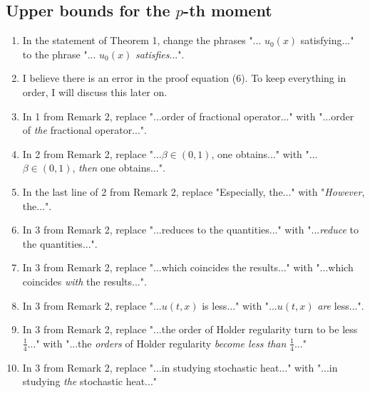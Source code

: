 \documentclass[a4paper,11pt]{article}
\numberwithin{equation}{section}
\numberwithin{equation}{section}
\theoremstyle{plain}
\theoremstyle{definition}
\begin{document}
\subsection{Upper bounds for the $p$-th moment}
\begin{enumerate}
	\item 
In the statement of Theorem 1, change the phrases "... $u_0(x)$ satisfying..." to the phrase "... $u_0(x)$ \textit{satisfies}...".

	\item
I believe there is an error in the proof equation (6). To keep everything in order, I will discuss this later on. 

	\item 
In 1 from Remark 2, replace "...order of fractional operator..." with "...order of \textit{the} fractional operator...".

	\item
In 2 from Remark 2, replace "...$\beta \in (0,1)$, one obtains..." with "...$\beta \in (0,1)$, \textit{then} one obtains...".

	\item 
In the last line of 2 from Remark 2, replace "Especially, the..." with "\textit{However}, the...".

	\item
In 3 from Remark 2, replace "...reduces to the quantities..." with "...\textit{reduce} to the quantities...".
	
	\item
In 3 from Remark 2, replace "...which coincides the results..." with "...which coincides \textit{with} the results...".

	\item 
In 3 from Remark 2, replace "...$u(t,x)$ is less..." with "...$u(t,x)$ \textit{are} less...".

	\item 
In 3 from Remark 2, replace "...the order of Holder regularity turn to be less $\frac{1}{4}$..." with "...the \textit{orders} of Holder regularity \textit{become less than} $\frac{1}{4}$..."

	\item
In 3 from Remark 2, replace "...in studying stochastic heat..." with "...in studying \textit{the} stochastic heat..." 
\end{enumerate}
	
\end{document}
